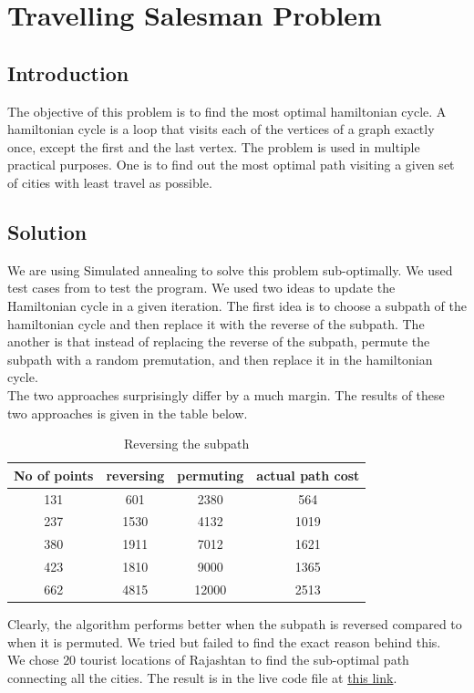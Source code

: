 \documentclass[journal, compsoc]{IEEEtran}
\begin{document}
\section{Travelling Salesman Problem}
\subsection{Introduction}
The objective of this problem is to find the most optimal hamiltonian cycle. A hamiltonian cycle is a loop that visits each of the
vertices of a graph exactly once, except the first and the last vertex. The problem is used in multiple practical purposes. One is
to find out the most optimal path visiting a given set of cities with least travel as possible.

\subsection{Solution}
We are using Simulated annealing to solve this problem sub-optimally. We used test cases from \cite{test_case} to test the program.
We used two ideas to update the Hamiltonian cycle in a given iteration. The first idea is to choose a subpath of the hamiltonian cycle
and then replace it with the reverse of the subpath. The another is that instead of replacing the reverse of the subpath, permute the
subpath with a random premutation, and then replace it in the hamiltonian cycle.\\
The two approaches surprisingly differ by a much margin. The results of these two approaches is given in the table below.
\begin{table}[!h]
\renewcommand{\arraystretch}{0.4}
\caption{Reversing the subpath}
\label{tab:cost}
\centering
\begin{tabular}{c||c||c||c}
\hline
\bfseries No of points & \bfseries reversing & permuting & \bfseries actual path cost\\
\hline\hline
131 & 601 & 2380 & 564\\
237 & 1530 & 4132 & 1019\\
380 & 1911 & 7012 & 1621\\
423 & 1810 & 9000 & 1365\\
662 & 4815 & 12000 & 2513\\
\hline
\end{tabular}
\end{table}


Clearly, the algorithm performs better when the subpath is reversed compared to when it is permuted. We tried but failed to find the
exact reason behind this.\\
We chose $20$ tourist locations of Rajashtan to find the sub-optimal path connecting all the cities. The result is in the live code
file at \href{https://github.com/sid-tiw/AI-codes/blob/main/codes/Traveling%20Salesman/cities.mlx}{this link}.
\end{document}
